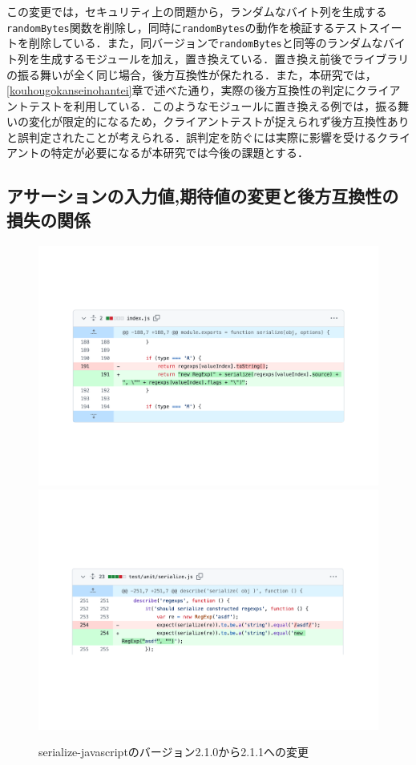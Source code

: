 \documentclass[11pt,dvipdfmx]{jreport}
\begin{document}
この変更では，セキュリティ上の問題から，ランダムなバイト列を生成する{\verb|randomBytes|}関数を削除し，同時に{\verb|randomBytes|}の動作を検証するテストスイートを削除している．また，同バージョンで{\verb|randomBytes|}と同等のランダムなバイト列を生成するモジュールを加え，置き換えている．置き換え前後でライブラリの振る舞いが全く同じ場合，後方互換性が保たれる．また，本研究では，\ref{kouhougokanseinohantei}章で述べた通り，実際の後方互換性の判定にクライアントテストを利用している．このようなモジュールに置き換える例では，振る舞いの変化が限定的になるため，クライアントテストが捉えられず後方互換性ありと誤判定されたことが考えられる．誤判定を防ぐには実際に影響を受けるクライアントの特定が必要になるが本研究では今後の課題とする．

\subsection{アサーションの入力値,期待値の変更と後方互換性の損失の関係}

\begin{figure}[t]
  \label{fig:rq1.change-test}
  \centering
  \includegraphics[width=1.0\linewidth]{fig/rq1/serialize-javascript/index.pdf}
  \includegraphics[width=1.0\linewidth]{fig/rq1/serialize-javascript/index.test.pdf}
  \caption{serialize-javascriptのバージョン2.1.0から2.1.1への変更}
\end{figure}
\end{document}

